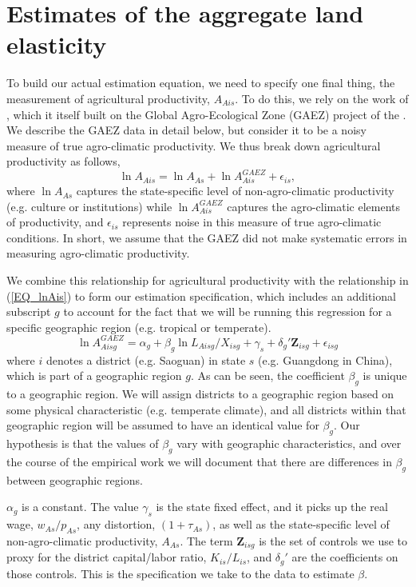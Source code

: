 \documentclass[11pt]{article}
\begin{document}
\section{Estimates of the aggregate land elasticity}
To build our actual estimation equation, we need to specify one final thing, the measurement of agricultural productivity, $A_{Ais}$. To do this, we rely on the work of \cite{galorozak2016}, which it itself built on the Global Agro-Ecological Zone (GAEZ) project of the \cite{gaez}. We describe the GAEZ data in detail below, but consider it to be a noisy measure of true agro-climatic productivity. We thus break down agricultural productivity as follows,
\begin{equation*}
	\ln A_{Ais} = \ln A_{As} + \ln A^{GAEZ}_{Ais} + \epsilon_{is},
\end{equation*}
where $\ln A_{As}$ captures the state-specific level of non-agro-climatic productivity (e.g. culture or institutions) while $\ln A^{GAEZ}_{Ais}$ captures the agro-climatic elements of productivity, and $\epsilon_{is}$ represents noise in this measure of true agro-climatic conditions. In short, we assume that the GAEZ did not make systematic errors in measuring agro-climatic productivity.

We combine this relationship for agricultural productivity with the relationship in (\ref{EQ_lnAis}) to form our estimation specification, which includes an additional subscript $g$ to account for the fact that we will be running this regression for a specific geographic region (e.g. tropical or temperate).
\begin{equation}
\ln A^{GAEZ}_{Aisg} = \alpha_g + \beta_g \ln L_{Aisg}/X_{isg} + \gamma_{s} + \delta_g' \mathbf{Z}_{isg} + \epsilon_{isg} \label{EQ_regress}
\end{equation}
where $i$ denotes a district (e.g. Saoguan) in state $s$ (e.g. Guangdong in China), which is part of a geographic region $g$. As can be seen, the coefficient $\beta_g$ is unique to a geographic region. We will assign districts to a geographic region based on some physical characteristic (e.g. temperate climate), and all districts within that geographic region will be assumed to have an identical value for $\beta_g$. Our hypothesis is that the values of $\beta_g$ vary with geographic characteristics, and over the course of the empirical work we will document that there are differences in $\beta_g$ between geographic regions.

$\alpha_g$ is a constant. The value $\gamma_s$ is the state fixed effect, and it picks up the real wage, $w_{As}/p_{As}$, any distortion, $(1+\tau_{As})$, as well as the state-specific level of non-agro-climatic productivity, $A_{As}$. The term $\mathbf{Z}_{isg}$ is the set of controls we use to proxy for the district capital/labor ratio, $K_{is}/L_{is}$, and $\delta_g'$ are the coefficients on those controls. This is the specification we take to the data to estimate $\beta$.
\end{document}
